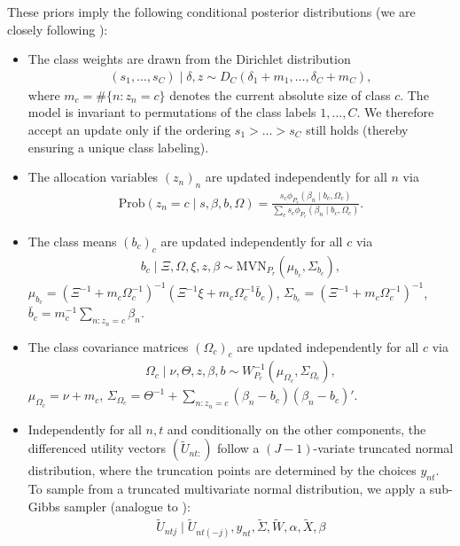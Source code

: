 \documentclass[article]{jss}
\begin{document}
These priors imply the following conditional posterior distributions (we are closely following \cite{Oelschlaeger:2020}):
\begin{itemize}
  \item The class weights are drawn from the Dirichlet distribution
  \begin{align*}
  (s_1,\dots,s_C)\mid \delta,z \sim D_C(\delta_1+m_1,\dots,\delta_C+m_C),
  \end{align*}
  where $m_c=\#\{n:z_n=c\}$ denotes the current absolute size of class $c$. The model is invariant to permutations of the class labels $1,\dots,C$. We therefore accept an update only if the ordering $s_1>\dots>s_C$ still holds (thereby ensuring a unique class labeling).
  \item The allocation variables $(z_n)_n$ are updated independently for all $n$ via
  \begin{align*}
  \text{Prob}(z_n=c\mid s,\beta,b,\Omega )=\frac{s_c\phi_{P_r}(\beta_n\mid b_c,\Omega_c)}{\sum_c s_c\phi_{P_r}(\beta_n\mid b_c,\Omega_c)}.
  \end{align*}
  \item The class means $(b_c)_c$ are updated independently for all $c$ via
  \begin{align*}
  b_c\mid \Xi,\Omega,\xi,z,\beta \sim\text{MVN}_{P_r}\left( \mu_{b_c}, \Sigma_{b_c}  \right),
  \end{align*}
  $\mu_{b_c}=(\Xi^{-1}+m_c\Omega_c^{-1})^{-1}(\Xi^{-1}\xi +m_c\Omega_c^{-1}\bar{b}_c)$, $\Sigma_{b_c}=(\Xi^{-1}+m_c\Omega_c^{-1})^{-1}$, $\bar{b}_c=m_c^{-1}\sum_{n:z_n=c} \beta_n$.
    \item The class covariance matrices $(\Omega_c)_c$ are updated independently for all $c$ via
  \begin{align*}
  \Omega_c \mid \nu,\Theta,z,\beta,b \sim W^{-1}_{P_r}(\mu_{\Omega_c},\Sigma_{\Omega_c}),
  \end{align*}
  $\mu_{\Omega_c}=\nu+m_c$, $\Sigma_{\Omega_c}=\Theta^{-1} + \sum_{n:z_n=c} (\beta_n-b_c)(\beta_n-b_c)'$.
  \item Independently for all $n,t$ and conditionally on the other components, the differenced utility vectors $(\tilde{U}_{nt:})$ follow a $(J-1)$-variate truncated normal distribution, where the truncation points are determined by the choices $y_{nt}$. To sample from a truncated multivariate normal distribution, we apply a sub-Gibbs sampler (analogue to \cite{Geweke:1998}):
  \begin{align*}
  \tilde{U}_{ntj} \mid \tilde{U}_{nt(-j)},y_{nt},\tilde{\Sigma},\tilde{W},\alpha,\tilde{X},\beta

\end{align*}
\end{itemize}
\end{document}
